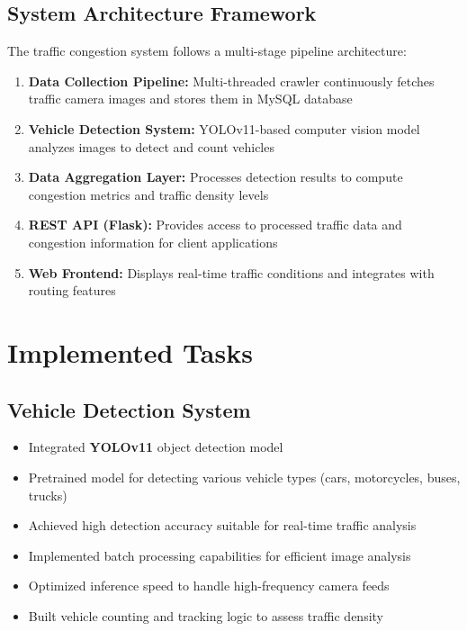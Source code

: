 \subsection{System Architecture Framework}

The traffic congestion system follows a multi-stage pipeline architecture:

\begin{enumerate}
    \item \textbf{Data Collection Pipeline:} Multi-threaded crawler continuously fetches traffic camera images and stores them in MySQL database
    
    \item \textbf{Vehicle Detection System:} YOLOv11-based computer vision model analyzes images to detect and count vehicles
    
    \item \textbf{Data Aggregation Layer:} Processes detection results to compute congestion metrics and traffic density levels
    
    \item \textbf{REST API (Flask):} Provides access to processed traffic data and congestion information for client applications
    
    \item \textbf{Web Frontend:} Displays real-time traffic conditions and integrates with routing features
\end{enumerate}
    
\section{Implemented Tasks}

\subsection{Vehicle Detection System}

\begin{itemize}
    \item Integrated \textbf{YOLOv11} object detection model
    \item Pretrained model for detecting various vehicle types (cars, motorcycles, buses, trucks)
    \item Achieved high detection accuracy suitable for real-time traffic analysis
    \item Implemented batch processing capabilities for efficient image analysis
    \item Optimized inference speed to handle high-frequency camera feeds
    \item Built vehicle counting and tracking logic to assess traffic density
\end{itemize}


